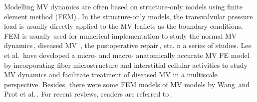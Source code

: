 \documentclass[fleqn,10pt]{wlscirep}
\begin{document}
Modelling MV dynamics are often based on structure-only models using finite element method (FEM)\,\cite{Lim2005Three,Prot2009Finite,Liao1993}. In the structure-only models, the transvalvular pressure load is usually directly applied to the MV leaflets as the boundary conditions. FEM is usually used for numerical implementation to study  the normal MV dynamics\,\cite{Kunzelman1993},  diseased MV\,\cite{Kunzelman1997,Kunzelman1998Altered} ,  the postoperative repair\,\cite{Kunzelman1998Altered,Kunzelman1998Flexible}, etc. n a series of studies. Lee et al.\,\cite{LeeRabbah-2015,Lee2017} have developed a micro- and macro- anatomically accurate MV FE model 
by incorporating fiber microstructure and interstitial cellular activities to study MV dynamics and facilitate treatment of diseased MV in a multiscale perspective. %
Besides, there were some FEM models of MV models by Wang\,\cite{Wang2012Patient} and Prot et al.\,\cite{Prot2009Finite,Prot2006An,Prot2009Nonlinear}. For recent reviews, readers are referred to\,\cite{sacks2019simulation,GaoQi-2017}.
\end{document}
